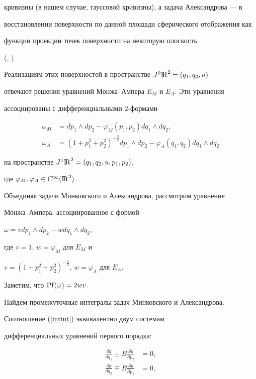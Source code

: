 кривизны (в нашем случае, гауссовой кривизны), а задача Александрова --- в


восстановлении поверхности по данной площади сферического отображения как


функции проекции точек поверхности на некоторую плоскость 


(\cite{minkowski}, \cite{aleksandrov}).





Реализациям этих поверхностей в пространстве $J^0{\mathrm{I\!R}}^2=(q_1,q_2,u)$


отвечают решения уравнений Монжа--Ампера $E_M$ и $E_A$. Эти уравнения


ассоциированы с дифференциальными 2-формами


\begin{align*}


\omega_M &=dp_1\wedge dp_2-\varphi_M(p_1,p_2)dq_1\wedge dq_2,\\


\omega_A &=(1+p_1^2+p_2^2)^{-\frac 32}dp_1\wedge dp_2-\varphi


_A(q_1,q_2)dq_1\wedge dq_2


\end{align*}


на пространстве $J^1{\mathrm{I\!R}}^2=(q_1,q_2,u,p_1,p_2)$,


где $\varphi_M,\varphi_A\in C^\infty ({\mathrm{I\!R}}^2)$.





Объединяя задачи Минковского и Александрова, рассмотрим уравнение 


Монжа--Ампера, ассоциированное с формой


$\omega =vdp_1\wedge dp_2-wdq_1\wedge dq_2$, 


где $v=1$, $w=\varphi_M$ для $E_M$ и


$v=(1+p_1^2+p_2^2)^{-\frac 32}$, $w=\varphi_A$ для $E_A.$ 


Заметим, что ${\operatorname{Pf}}(\omega )=2wv.$





Найдем промежуточные интегралы задач Минковского и Александрова.


Соотношение (\ref{intint}) эквивалентно двум системам 


дифференциальных уравнений первого порядка:


\begin{equation}


\label{computintint} 


\begin{split}


\frac{dk}{dq_1}\pm B\frac{\partial k}{\partial p_2} &=0,\\


\frac{dk}{dq_2}\mp B\frac{\partial k}{\partial p_1} &=0,


\end{split}


\end{equation}


